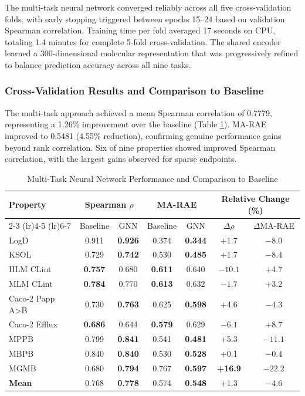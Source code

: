 \documentclass[11pt,a4paper]{article}
\begin{document}
The multi-task neural network converged reliably across all five cross-validation folds, with early stopping triggered between epochs 15--24 based on validation Spearman correlation. Training time per fold averaged 17 seconds on CPU, totaling 1.4 minutes for complete 5-fold cross-validation. The shared encoder learned a 300-dimensional molecular representation that was progressively refined to balance prediction accuracy across all nine tasks.

\subsubsection{Cross-Validation Results and Comparison to Baseline}

The multi-task approach achieved a mean Spearman correlation of 0.7779, representing a 1.26\% improvement over the baseline (Table \ref{tab:gnn_cv}). MA-RAE improved to 0.5481 (4.55\% reduction), confirming genuine performance gains beyond rank correlation. Six of nine properties showed improved Spearman correlation, with the largest gains observed for sparse endpoints.

\begin{table}[h]
\centering
\caption{Multi-Task Neural Network Performance and Comparison to Baseline}
\label{tab:gnn_cv}
\small
\begin{tabular}{lcccccc}
\toprule
Property & \multicolumn{2}{c}{Spearman $\rho$} & \multicolumn{2}{c}{MA-RAE} & \multicolumn{2}{c}{Relative Change (\%)} \\
\cmidrule(lr){2-3} \cmidrule(lr){4-5} \cmidrule(lr){6-7}
 & Baseline & GNN & Baseline & GNN & $\Delta\rho$ & $\Delta$MA-RAE \\
\midrule
LogD & 0.911 & \textbf{0.926} & 0.374 & \textbf{0.344} & +1.7 & $-8.0$ \\
KSOL & 0.729 & \textbf{0.742} & 0.530 & \textbf{0.485} & +1.7 & $-8.4$ \\
HLM CLint & \textbf{0.757} & 0.680 & \textbf{0.611} & 0.640 & $-10.1$ & +4.7 \\
MLM CLint & \textbf{0.784} & 0.770 & \textbf{0.613} & 0.632 & $-1.7$ & +3.2 \\
Caco-2 Papp A>B & 0.730 & \textbf{0.763} & 0.625 & \textbf{0.598} & +4.6 & $-4.3$ \\
Caco-2 Efflux & \textbf{0.686} & 0.644 & \textbf{0.579} & 0.629 & $-6.1$ & +8.7 \\
MPPB & 0.799 & \textbf{0.841} & 0.541 & \textbf{0.481} & +5.3 & $-11.1$ \\
MBPB & 0.840 & \textbf{0.840} & 0.530 & \textbf{0.528} & +0.1 & $-0.4$ \\
MGMB & 0.680 & \textbf{0.794} & 0.767 & \textbf{0.597} & \textbf{+16.9} & \textbf{$-22.2$} \\
\midrule
\textbf{Mean} & 0.768 & \textbf{0.778} & 0.574 & \textbf{0.548} & +1.3 & $-4.6$ \\
\bottomrule
\end{tabular}
\end{table}
\end{document}
